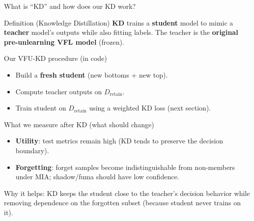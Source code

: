 \documentclass[aspectratio=169, 11pt]{beamer}
\begin{document}
\begin{frame}{What is ``KD'' and how does our KD work?}
  \begin{block}{Definition (Knowledge Distillation)}
    \textbf{KD} trains a \textbf{student} model to mimic a \textbf{teacher} model’s outputs while also fitting labels.
    The teacher is the \textbf{original pre-unlearning VFL model} (frozen).
  \end{block}
  \vspace{0.6em}
  \begin{exampleblock}{Our VFU-KD procedure (in code)}
    \begin{itemize}
      \item Build a \textbf{fresh student} (new bottoms + new top).
      \item Compute teacher outputs on \(D_{\text{retain}}\).
      \item Train student on \(D_{\text{retain}}\) using a weighted KD loss (next section).
    \end{itemize}
  \end{exampleblock}
  \vspace{0.4em}
  \begin{alertblock}{What we measure after KD (what should change)}
    \small
    \begin{itemize}
      \item \textbf{Utility}: test metrics remain high (KD tends to preserve the decision boundary).
      \item \textbf{Forgetting}: forget samples become indistinguishable from non-members under MIA; shadow/fuma should have low confidence.
    \end{itemize}
  \end{alertblock}
  \small Why it helps: KD keeps the student close to the teacher’s decision behavior while removing dependence on the forgotten subset (because student never trains on it).
\end{frame}
\end{document}
